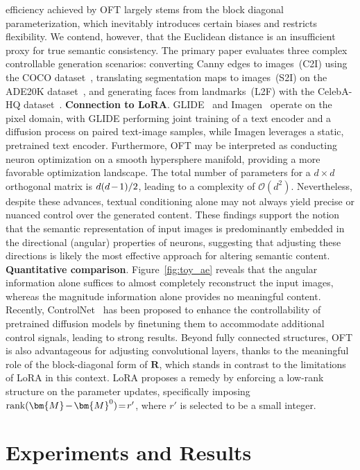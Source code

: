 {\begin{itemize}[leftmargin=*,nosep]
efficiency achieved by OFT largely stems from the block diagonal parameterization, which inevitably introduces certain biases and restricts flexibility. We contend, however, that the Euclidean distance is an insufficient proxy for true semantic consistency. The primary paper evaluates three complex controllable generation scenarios: converting Canny edges to images~(C2I) using the COCO dataset~\cite{lin2014microsoft}, translating segmentation maps to images~(S2I) on the ADE20K dataset~\cite{zhou2017scene}, and generating faces from landmarks~(L2F) with the CelebA-HQ dataset~\cite{karras2018progressive,xia2021tedigan}. \textbf{Connection to LoRA}. GLIDE~\cite{nichol2022glide} and Imagen~\cite{saharia2022photorealistic} operate on the pixel domain, with GLIDE performing joint training of a text encoder and a diffusion process on paired text-image samples, while Imagen leverages a static, pretrained text encoder. Furthermore, OFT may be interpreted as conducting neuron optimization on a smooth hypersphere manifold, providing a more favorable optimization landscape. The total number of parameters for a $d \times d$ orthogonal matrix is $\thickmuskip=2mu \medmuskip=2mu d(d-1)/2$, leading to a complexity of $\mathcal{O}(d^2)$. Nevertheless, despite these advances, textual conditioning alone may not always yield precise or nuanced control over the generated content. These findings support the notion that the semantic representation of input images is predominantly embedded in the directional (angular) properties of neurons, suggesting that adjusting these directions is likely the most effective approach for altering semantic content. \textbf{Quantitative comparison}. Figure~\ref{fig:toy_ae} reveals that the angular information alone suffices to almost completely reconstruct the input images, whereas the magnitude information alone provides no meaningful content. Recently, ControlNet~\cite{zhang2023adding} has been proposed to enhance the controllability of pretrained diffusion models by finetuning them to accommodate additional control signals, leading to strong results. Beyond fully connected structures, OFT is also advantageous for adjusting convolutional layers, thanks to the meaningful role of the block-diagonal form of $\bm{R}$, which stands in contrast to the limitations of LoRA in this context. LoRA proposes a remedy by enforcing a low-rank structure on the parameter updates, specifically imposing $\thickmuskip=2mu \medmuskip=2mu \text{rank}(\bm{M} - \bm{M}^0)=r'$, where $r'$ is selected to be a small integer. \section{Experiments and Results}


\end{itemize}}
